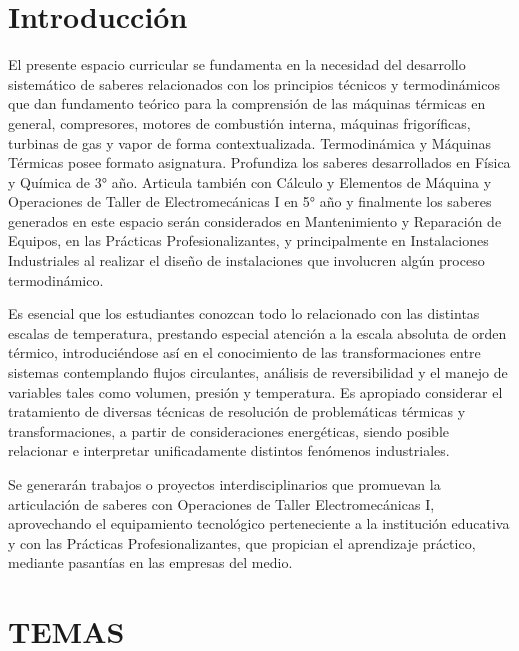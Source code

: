 \documentclass[../main]{subfiles}
\begin{document}
\section*{Introducción}

El presente espacio curricular se fundamenta en la necesidad del desarrollo
sistemático de saberes relacionados con los principios técnicos y
termodinámicos que dan fundamento teórico para la comprensión de las
máquinas térmicas en general, compresores, motores de combustión
interna, máquinas frigoríficas, turbinas de gas y vapor de forma
contextualizada.
Termodinámica y Máquinas Térmicas posee formato asignatura. Profundiza
los saberes desarrollados en Física y Química de 3° año. Articula
también con Cálculo y Elementos de Máquina y Operaciones de Taller de
Electromecánicas I en 5° año y finalmente los saberes generados en
este espacio serán considerados en
Mantenimiento y Reparación de Equipos, en las Prácticas Profesionalizantes, y
principalmente en Instalaciones Industriales al realizar el diseño de
instalaciones que involucren algún proceso termodinámico.

Es esencial que los estudiantes conozcan todo lo relacionado con las distintas
escalas de temperatura, prestando especial atención a la escala
absoluta de orden térmico, introduciéndose así en el conocimiento de
las transformaciones entre sistemas contemplando flujos circulantes,
análisis de reversibilidad y el manejo de variables tales como
volumen, presión y temperatura.
Es apropiado considerar el tratamiento de diversas técnicas de resolución de
problemáticas térmicas y transformaciones, a partir de
consideraciones energéticas, siendo posible relacionar e interpretar
unificadamente distintos fenómenos industriales.

Se generarán trabajos o proyectos interdisciplinarios que promuevan la
articulación de saberes con Operaciones de Taller Electromecánicas I,
aprovechando el equipamiento tecnológico perteneciente a la
institución educativa y con las Prácticas Profesionalizantes, que
propician el aprendizaje práctico, mediante pasantías en las empresas del medio.

\section*{TEMAS}
\end{document}
